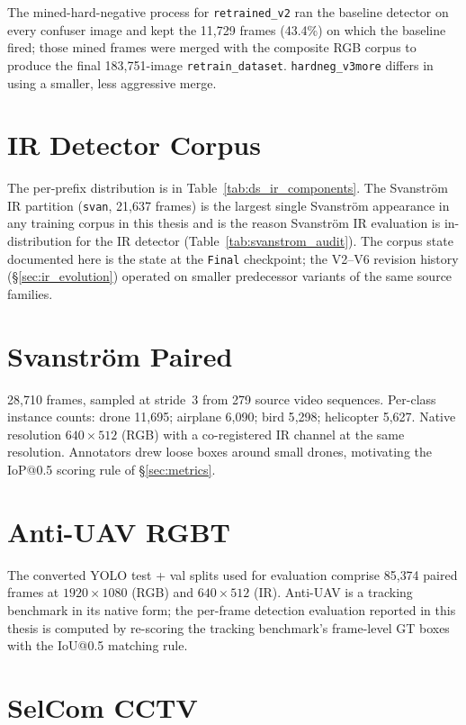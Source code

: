 \noindent The mined-hard-negative process for \texttt{retrained\_v2} ran the baseline detector on every confuser image and kept the 11{,}729 frames (43.4\%) on which the baseline fired; those mined frames were merged with the composite RGB corpus to produce the final 183{,}751-image \texttt{retrain\_dataset}. \texttt{hardneg\_v3more} differs in using a smaller, less aggressive merge.

\section{IR Detector Corpus}

The per-prefix distribution is in Table~\ref{tab:ds_ir_components}. The Svanstr\"om IR partition (\texttt{svan}, 21{,}637 frames) is the largest single Svanstr\"om appearance in any training corpus in this thesis and is the reason Svanstr\"om IR evaluation is in-distribution for the IR detector (Table~\ref{tab:svanstrom_audit}). The corpus state documented here is the state at the \texttt{Final} checkpoint; the V2--V6 revision history (\S\ref{sec:ir_evolution}) operated on smaller predecessor variants of the same source families.

\section{Svanstr\"om Paired}

28{,}710 frames, sampled at stride~3 from 279 source video sequences. Per-class instance counts: drone 11{,}695; airplane 6{,}090; bird 5{,}298; helicopter 5{,}627. Native resolution $640{\times}512$ (RGB) with a co-registered IR channel at the same resolution. Annotators drew loose boxes around small drones, motivating the IoP@0.5 scoring rule of \S\ref{sec:metrics}.

\section{Anti-UAV RGBT}

The converted YOLO test + val splits used for evaluation comprise 85{,}374 paired frames at $1920{\times}1080$ (RGB) and $640{\times}512$ (IR). Anti-UAV is a tracking benchmark in its native form; the per-frame detection evaluation reported in this thesis is computed by re-scoring the tracking benchmark's frame-level GT boxes with the IoU@0.5 matching rule.

\section{SelCom CCTV}

